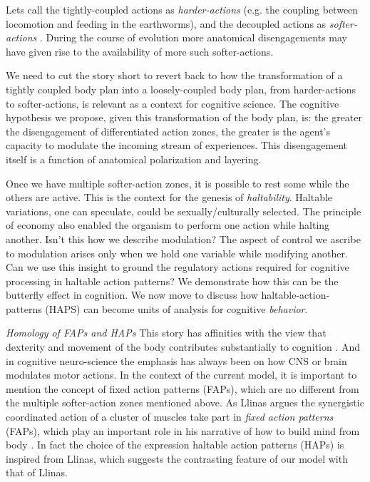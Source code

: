 Lets call the tightly-coupled actions as \textit{harder-actions} (e.g. the coupling between locomotion and feeding in the earthworms), and the decoupled actions as \textit{softer-actions} \cite{nagarjuna_muscularity_2005}. During the course of evolution more anatomical disengagements may have given rise to the availability of more such softer-actions. 

We need to cut the story short to revert back to how the transformation of a tightly coupled body plan into a loosely-coupled body plan, from harder-actions to softer-actions, is relevant as a context for cognitive science. The cognitive hypothesis we propose, given this transformation of the body plan, is: the greater the disengagement of differentiated action zones, the greater is the agent's capacity to modulate the incoming stream of experiences. This disengagement itself is a function of anatomical polarization and layering. 

Once we have multiple softer-action zones, it is possible to rest some while the others are active. This is the context for the genesis of \textit{haltability}. Haltable variations, one can speculate, could be sexually/culturally selected. The principle of economy also enabled the organism to perform one action while halting another. Isn't this how we describe modulation? The aspect of control we ascribe to modulation arises only when we hold one variable while modifying another. Can we use this insight to ground the regulatory actions required for cognitive processing in haltable action patterns?  We demonstrate how this can be the butterfly effect in cognition. We now move to discuss how haltable-action-patterns (HAPS) can become units of analysis for cognitive \textit{behavior}. 

\emph{Homology of FAPs and HAPs} This story has affinities with the view that dexterity and movement of the body contributes substantially to cognition \cite{bernstein2014dexterity}. And in cognitive neuro-science the emphasis has always been on how CNS or brain modulates motor actions. In the context of the current model, it is important to mention the concept of fixed action patterns (FAPs), which are no different from the multiple softer-action zones mentioned above. As Llinas argues the synergistic coordinated action of a cluster of muscles take part in \textit{fixed action patterns} (FAPs), which play an important role in his narrative of how to build mind from body \cite{llinas2002vortex}. In fact the choice of the expression haltable action patterns (HAPs) is inspired from Llinas, which suggests the contrasting feature of our model with that of Llinas. 

